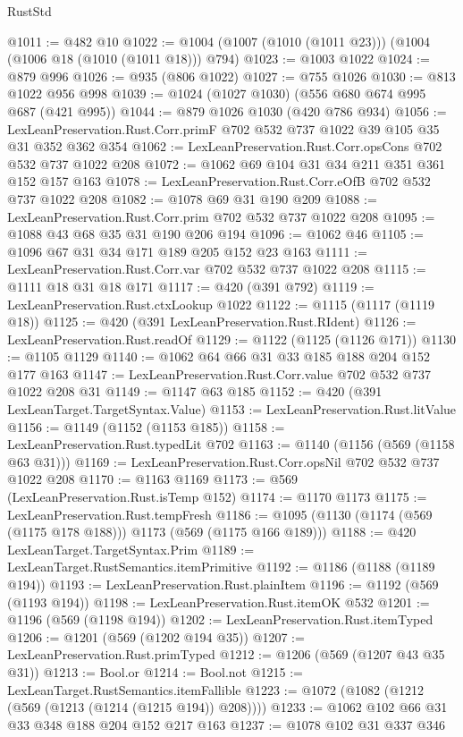 \begin{lexlean}{RustStd}
\begin{coremodule}
@1011 := @482 @10
@1022 := @1004 (@1007 (@1010 (@1011 @23))) (@1004 (@1006 @18 (@1010 (@1011 @18))) @794)
@1023 := @1003 @1022
@1024 := @879 @996
@1026 := @935 (@806 @1022)
@1027 := @755 @1026
@1030 := @813 @1022 @956 @998
@1039 := @1024 (@1027 @1030) (@556 @680 @674 @995 @687 (@421 @995))
@1044 := @879 @1026 @1030 (@420 @786 @934)
@1056 := LexLeanPreservation.Rust.Corr.primF @702 @532 @737 @1022 @39 @105 @35 @31 @352 @362 @354
@1062 := LexLeanPreservation.Rust.Corr.opsCons @702 @532 @737 @1022 @208
@1072 := @1062 @69 @104 @31 @34 @211 @351 @361 @152 @157 @163
@1078 := LexLeanPreservation.Rust.Corr.eOfB @702 @532 @737 @1022 @208
@1082 := @1078 @69 @31 @190 @209
@1088 := LexLeanPreservation.Rust.Corr.prim @702 @532 @737 @1022 @208
@1095 := @1088 @43 @68 @35 @31 @190 @206 @194
@1096 := @1062 @46
@1105 := @1096 @67 @31 @34 @171 @189 @205 @152 @23 @163
@1111 := LexLeanPreservation.Rust.Corr.var @702 @532 @737 @1022 @208
@1115 := @1111 @18 @31 @18 @171
@1117 := @420 (@391 @792)
@1119 := LexLeanPreservation.Rust.ctxLookup @1022
@1122 := @1115 (@1117 (@1119 @18))
@1125 := @420 (@391 LexLeanPreservation.Rust.RIdent)
@1126 := LexLeanPreservation.Rust.readOf
@1129 := @1122 (@1125 (@1126 @171))
@1130 := @1105 @1129
@1140 := @1062 @64 @66 @31 @33 @185 @188 @204 @152 @177 @163
@1147 := LexLeanPreservation.Rust.Corr.value @702 @532 @737 @1022 @208 @31
@1149 := @1147 @63 @185
@1152 := @420 (@391 LexLeanTarget.TargetSyntax.Value)
@1153 := LexLeanPreservation.Rust.litValue
@1156 := @1149 (@1152 (@1153 @185))
@1158 := LexLeanPreservation.Rust.typedLit @702
@1163 := @1140 (@1156 (@569 (@1158 @63 @31)))
@1169 := LexLeanPreservation.Rust.Corr.opsNil @702 @532 @737 @1022 @208
@1170 := @1163 @1169
@1173 := @569 (LexLeanPreservation.Rust.isTemp @152)
@1174 := @1170 @1173
@1175 := LexLeanPreservation.Rust.tempFresh
@1186 := @1095 (@1130 (@1174 (@569 (@1175 @178 @188))) @1173 (@569 (@1175 @166 @189)))
@1188 := @420 LexLeanTarget.TargetSyntax.Prim
@1189 := LexLeanTarget.RustSemantics.itemPrimitive
@1192 := @1186 (@1188 (@1189 @194))
@1193 := LexLeanPreservation.Rust.plainItem
@1196 := @1192 (@569 (@1193 @194))
@1198 := LexLeanPreservation.Rust.itemOK @532
@1201 := @1196 (@569 (@1198 @194))
@1202 := LexLeanPreservation.Rust.itemTyped
@1206 := @1201 (@569 (@1202 @194 @35))
@1207 := LexLeanPreservation.Rust.primTyped
@1212 := @1206 (@569 (@1207 @43 @35 @31))
@1213 := Bool.or
@1214 := Bool.not
@1215 := LexLeanTarget.RustSemantics.itemFallible
@1223 := @1072 (@1082 (@1212 (@569 (@1213 (@1214 (@1215 @194)) @208))))
@1233 := @1062 @102 @66 @31 @33 @348 @188 @204 @152 @217 @163
@1237 := @1078 @102 @31 @337 @346

\end{coremodule}
\end{lexlean}
